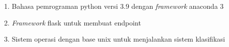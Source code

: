 \begin{enumerate}
    \item Bahasa pemrograman python versi 3.9 dengan \textit{framework} anaconda 3
    \item \textit{Framework} flask untuk membuat endpoint 
    \item Sistem operasi dengan base unix untuk menjalankan sistem klasifikasi
\end{enumerate}
